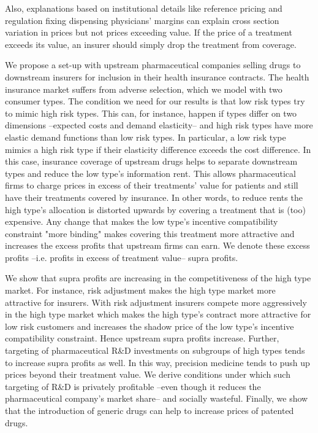 \documentclass[12pt,english,a4paper]{article}
\begin{document}
Also, explanations based on institutional details like reference pricing and regulation fixing dispensing physicians' margins \citep{Danzon2010} can explain cross section variation in prices but not prices exceeding value. If the price of a treatment exceeds its value, an insurer should simply drop the treatment from coverage.

We propose a set-up with upstream pharmaceutical companies selling drugs to downstream insurers for inclusion in their health insurance contracts. The health insurance market suffers from adverse selection, which we model with two consumer types. The condition we need for our results is that low risk types try to mimic high risk types. This can, for instance, happen if types differ on two dimensions --expected costs and demand elasticity-- and high risk types have more elastic demand functions than low risk types. In particular, a low risk type mimics a high risk type if their elasticity difference exceeds the cost difference. In this case, insurance coverage of upstream drugs helps to separate downstream types and reduce the low type's information rent. This allows pharmaceutical firms to charge prices in excess of their treatments' value for patients and still have their treatments covered by insurance. In other words, to reduce rents the high type's allocation is distorted upwards by covering a treatment that is (too) expensive. Any change that makes the low type's incentive compatibility constraint "more binding" makes covering this treatment more attractive and increases the excess profits that upstream firms can earn. We denote these excess profits --i.e. profits in excess of treatment value-- supra profits.

We show that supra profits are increasing in the competitiveness of the high type market. For instance, risk adjustment makes the high type market more attractive for insurers. With risk adjustment insurers compete more aggressively in the high type market which makes the high type's contract more attractive for low risk customers and increases the shadow price of the low type's incentive compatibility constraint. Hence upstream supra profits increase. Further, targeting of pharmaceutical R\&D investments on subgroups of high types tends to increase supra profits as well. In this way, precision medicine tends to push up prices beyond their treatment value. We derive conditions under which such targeting of R\&D is privately profitable --even though it reduces the pharmaceutical company's market share-- and socially wasteful. Finally, we show that the introduction of generic drugs can help to increase prices of patented drugs.
\end{document}
